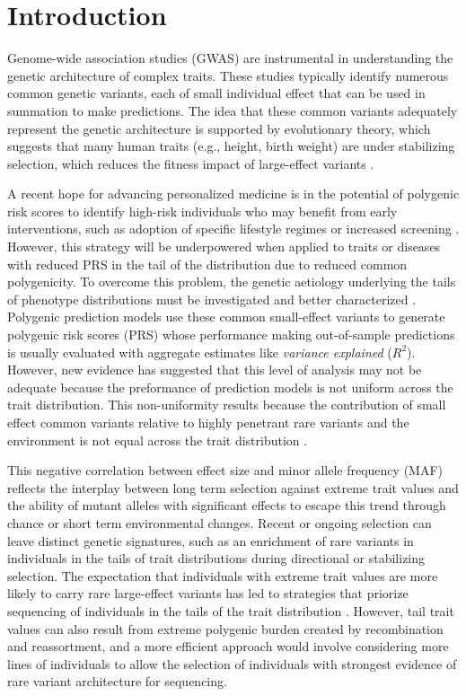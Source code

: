 \documentclass[times]{zHenriquesLab-StyleBioRxiv}
\begin{document}
\section*{Introduction} 
Genome-wide association studies (GWAS) are instrumental in
understanding the genetic architecture of complex traits.  These
studies typically identify numerous common genetic variants, each of
small individual effect \citep{gwas} that can be used in summation to
make predictions. The idea that these common variants adequately
represent the genetic architecture is supported by evolutionary
theory, which suggests that many human traits (e.g., height, birth
weight) are under stabilizing selection, which reduces the fitness
impact of large-effect variants \citep{v_select}.

A recent hope for advancing personalized medicine is in the potential
of polygenic risk scores to identify high-risk individuals who may
benefit from early interventions, such as adoption of specific
lifestyle regimes or increased screening \citep{bt_7, bt_8, bt_9,
  bt_10}.  However, this strategy will be underpowered when applied to
traits or diseases with reduced PRS in the tail of the distribution
due to reduced common polygenicity. To overcome this problem, the
genetic aetiology underlying the tails of phenotype distributions must
be investigated and better characterized \citep{bt_1}.  Polygenic
prediction models use these common small-effect variants to generate
polygenic risk scores (PRS) whose performance making out-of-sample
predictions is usually evaluated with aggregate estimates like
\emph{variance explained} ($R^2$).  However, new evidence has
suggested that this level of analysis may not be adequate because the
preformance of prediction models is not uniform across the trait
distribution.  This non-uniformity results because the contribution of
small effect common variants relative to highly penetrant rare
variants and the environment is not equal across the trait
distribution \citep{bt_1, bt_2}.

This negative correlation between effect size and minor allele
frequency (MAF) reflects the interplay between long term selection against
extreme trait values and the ability of mutant alleles with
significant effects to escape this trend through chance or short term
environmental changes. Recent or ongoing selection can leave distinct
genetic signatures, such as an enrichment of rare variants in
individuals in the tails of trait distributions during directional or
stabilizing selection. The expectation that individuals with extreme
trait values are more likely to carry rare large-effect variants has
led to strategies that priorize sequencing of individuals in the tails
of the trait distribution \citep{bt_3, bt_4}.  However, tail trait
values can also result from extreme polygenic burden created by
recombination and reassortment, and a more efficient approach would
involve considering more lines of individuals to allow the selection
of individuals with strongest evidence of rare variant architecture
for sequencing.
\end{document}
